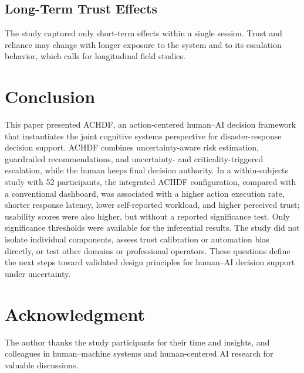 \documentclass[journal]{IEEEtran}
\theoremstyle{plain}
\theoremstyle{definition}
\begin{document}
    \subsection{Long-Term Trust Effects}
    The study captured only short-term effects within a single session. Trust and reliance may change with longer exposure to the system and to its escalation behavior, which calls for longitudinal field studies.

\section{Conclusion}
This paper presented ACHDF, an action-centered human--AI decision framework that instantiates the joint cognitive systems perspective for disaster-response decision support. ACHDF combines uncertainty-aware risk estimation, guardrailed recommendations, and uncertainty- and criticality-triggered escalation, while the human keeps final decision authority. In a within-subjects study with 52 participants, the integrated ACHDF configuration, compared with a conventional dashboard, was associated with a higher action execution rate, shorter response latency, lower self-reported workload, and higher perceived trust; usability scores were also higher, but without a reported significance test. Only significance thresholds were available for the inferential results. The study did not isolate individual components, assess trust calibration or automation bias directly, or test other domains or professional operators. These questions define the next steps toward validated design principles for human--AI decision support under uncertainty.

\section*{Acknowledgment}
The author thanks the study participants for their time and insights, and colleagues in human--machine systems and human-centered AI research for valuable discussions.


% 
\end{document}
